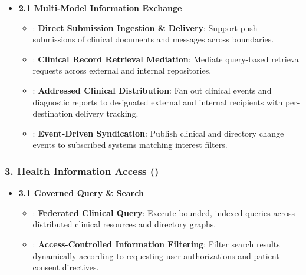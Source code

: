 \begin{itemize}

\item
\textbf{2.1 Multi-Model Information Exchange}


\begin{itemize}

\item
\texttt{}: \textbf{Direct Submission Ingestion \& Delivery}: Support push submissions of clinical documents and messages across boundaries.



\item
\texttt{}: \textbf{Clinical Record Retrieval Mediation}: Mediate query-based retrieval requests across external and internal repositories.



\item
\texttt{}: \textbf{Addressed Clinical Distribution}: Fan out clinical events and diagnostic reports to designated external and internal recipients with per-destination delivery tracking.



\item
\texttt{}: \textbf{Event-Driven Syndication}: Publish clinical and directory change events to subscribed systems matching interest filters.



\end{itemize}


\end{itemize}
\label{rad:enabling:621}
\subsubsection*{3. Health Information Access (\texttt{})}
\label{rad:enabling:622}

\begin{itemize}

\item
\textbf{3.1 Governed Query \& Search}


\begin{itemize}

\item
\texttt{}: \textbf{Federated Clinical Query}: Execute bounded, indexed queries across distributed clinical resources and directory graphs.



\item
\texttt{}: \textbf{Access-Controlled Information Filtering}: Filter search results dynamically according to requesting user authorizations and patient consent directives.



\end{itemize}


\end{itemize}
\label{rad:enabling:626}
